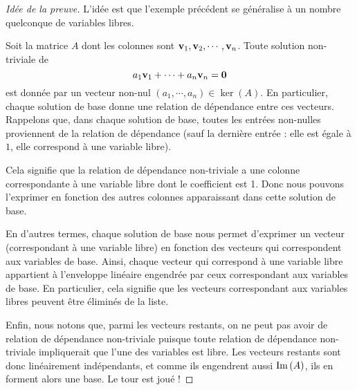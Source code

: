 \begin{proof} [Idée de la preuve]
L'idée est que l'exemple précédent se généralise à un nombre quelconque de variables libres.  

Soit la matrice $A$ dont les colonnes sont $\mathbf{v}_1,\mathbf{v}_2, \cdots, \mathbf{v}_n$.
Toute solution non-triviale de
$$
a_1 \mathbf{v}_1 + \cdots + a_n \mathbf{v}_n = \mathbf{0}
$$
est donnée par un vecteur non-nul $(a_1, \cdots, a_n)\in \ker(A)$.  En particulier,
chaque solution de base donne une relation de dépendance entre ces vecteurs.
Rappelons que, dans chaque solution de base, toutes les entrées non-nulles proviennent de la relation de dépendance (sauf la dernière entrée : elle est égale à $1$, elle correspond à une variable libre).

Cela signifie que la relation de dépendance non-triviale a une colonne
correspondante à une variable libre dont le coefficient est 1. Donc nous
pouvons l'exprimer en fonction des autres colonnes apparaissant dans cette solution de base.  

En d'autres termes, chaque solution de base nous permet d'exprimer un vecteur 
(correspondant à une variable libre) en fonction des vecteurs qui correspondent aux variables de base. Ainsi, chaque vecteur qui 
correspond à une variable libre appartient \`a l'enveloppe linéaire engendr\'ee par ceux 
correspondant aux variables de base. En particulier, cela signifie que les vecteurs
correspondant aux variables libres peuvent être éliminés de la liste.

Enfin, nous notons que, parmi les vecteurs restants, on ne peut pas avoir de relation de dépendance non-triviale puisque toute relation de dépendance non-triviale
impliquerait que l'une des variables est libre.
Les vecteurs restants sont donc linéairement indépendants, et comme ils engendrent aussi $\operatorname{Im}\,(A)$, ils en forment alors une base. Le tour est joué !
\end{proof}






